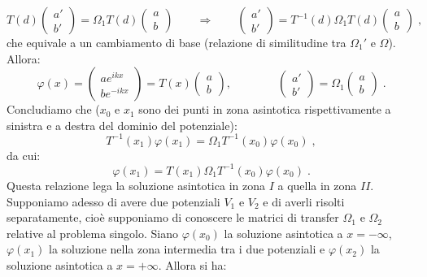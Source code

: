 \documentclass[10pt,a4paper]{report}
\theoremstyle{definition}
\numberwithin{equation}{section}
\begin{document}
\begin{equation}
T(d)\left(\begin{matrix}
a' \\
b'
\end{matrix}\right)=\Omega_1 T(d)\left(
\begin{matrix}
a \\
b
\end{matrix}\right) \qquad \Longrightarrow \qquad \left(
\begin{matrix}
a' \\
b'
\end{matrix}\right)=T^{-1}(d)\Omega_1 T(d)\left(
\begin{matrix}
a \\
b
\end{matrix}\right)\;,
\end{equation}
che equivale a un cambiamento di base (relazione di similitudine tra $\Omega_1'$ e $\Omega$). Allora:
$$
\varphi(x)=\left(
\begin{matrix}
ae^{ikx} \\
be^{-ikx}
\end{matrix}\right)=T(x)\left(
\begin{matrix}
a \\
b
\end{matrix}\right), \qquad \qquad
\left(\begin{matrix}
a' \\
b'
\end{matrix}\right)=\Omega_1\left(
\begin{matrix}
a \\
b
\end{matrix}\right)\;.
$$
Concludiamo che ($x_0$ e $x_1$ sono dei punti in zona asintotica rispettivamente a sinistra e a destra del dominio del potenziale):
\begin{equation}
T^{-1}(x_1)\varphi(x_1)=\Omega_1 T^{-1}(x_0)\varphi(x_0)\;,
\end{equation}
da cui:
\begin{equation}
\varphi(x_1)=T(x_1)\Omega_1 T^{-1}(x_0)\varphi(x_0)\;.
\end{equation}
Questa relazione lega la soluzione asintotica in zona $I$ a quella in zona $II$. \\
Supponiamo adesso di avere due potenziali $V_1$ e $V_2$ e di averli risolti separatamente, cioè supponiamo di conoscere le matrici di transfer $\Omega_1$ e $\Omega_2$ relative al problema singolo. Siano $\varphi(x_0)$ la soluzione asintotica a $x=-\infty$, $\varphi(x_1)$ la soluzione nella zona intermedia tra i due potenziali e $\varphi(x_2)$ la soluzione asintotica a $x=+\infty$. Allora si ha:
\end{document}
